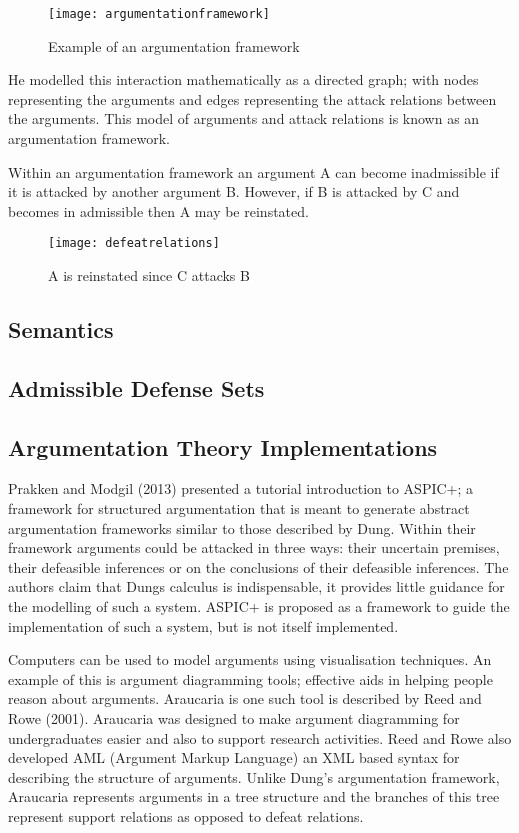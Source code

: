 \begin{figure}[h]
\caption{Example of an argumentation framework}
\centering
\texttt{[image: argumentationframework]}
\end{figure}

He modelled this interaction mathematically as a directed graph; with nodes representing the arguments and edges representing the attack relations between the arguments. This model of arguments and attack relations is known as an argumentation framework.

Within an argumentation framework an argument A can become inadmissible if it is attacked by another argument B. However, if B is attacked by C and becomes in admissible then A may be reinstated.

\begin{figure}[h]
\caption{A is reinstated since C attacks B}
\centering
\texttt{[image: defeatrelations]}
\end{figure}

\subsection{Semantics}

\subsection{Admissible Defense Sets}

\cite{vreeswijk2006algorithm}


\subsection{Argumentation Theory Implementations}

Prakken and Modgil (2013) presented a tutorial introduction to ASPIC+; a framework for structured argumentation that is meant to generate abstract argumentation frameworks similar to those described by Dung. Within their framework arguments could be attacked in three ways: their uncertain premises, their defeasible inferences or on the conclusions of their defeasible inferences. The authors claim that Dungs calculus is indispensable, it provides little guidance for the modelling of such a system. ASPIC+ is proposed as a framework to guide the implementation of such a system, but is not itself implemented.

Computers can be used to model arguments using visualisation techniques. An example of this is argument diagramming tools; effective aids in helping people reason about arguments. Araucaria is one such tool is described by Reed and Rowe (2001). Araucaria was designed to make argument diagramming for undergraduates easier and also to support research activities. Reed and Rowe also developed AML (Argument Markup Language) an XML based syntax for describing the structure of arguments. Unlike Dung’s argumentation framework, Araucaria represents arguments in a tree structure and the branches of this tree represent support relations as opposed to defeat relations.

